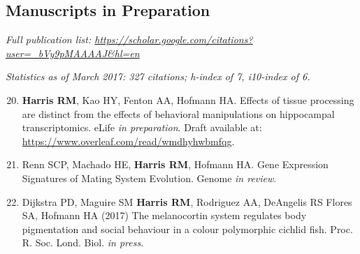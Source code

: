 \documentclass[margin,line]{resume}
\newenvironment{benumerate}[1]{
    \let\oldItem\item
    \def\item{\addtocounter{enumi}{-2}\oldItem}
    \begin{enumerate}
    \setcounter{enumi}{#1}
    \addtocounter{enumi}{1}
}{
    \end{enumerate}
}
\begin{document}
\begin{resume}




 \section{\mysidestyle Manuscripts in Preparation}
    
\begin{description}[leftmargin=0pt]  
\setlength{\itemsep}{2pt} 
\item[] {\em Full publication list: \url{https://scholar.google.com/citations?user=_bVy9pMAAAAJ&hl=en}}
\item[] {\em Statistics as of March 2017: 327 citations; h-index of 7, i10-index of 6.}
\item[]
\end{description}


\begin{benumerate}{19}
\setlength{\itemsep}{3pt}

\item {\bf Harris RM}, Kao HY, Fenton AA, Hofmann HA. Effects of tissue processing are distinct from the effects of behavioral manipulations on hippocampal transcriptomics. eLife {\em in preparation}. Draft available at: \url{https://www.overleaf.com/read/wmdhyhwbmfqg}.   

\item Renn SCP, Machado HE, {\bf Harris RM}, Hofmann HA. Gene Expression Signatures of Mating System Evolution. Genome {\em in review}.

\item Dijkstra PD, Maguire SM {\bf Harris RM}, Rodriguez AA, DeAngelis RS Flores SA, Hofmann HA (2017) The melanocortin system regulates body pigmentation and social behaviour in a colour polymorphic cichlid fish. Proc. R. Soc. Lond. Biol. {\em in press}.
\end{benumerate}



\end{resume}
\end{document}
